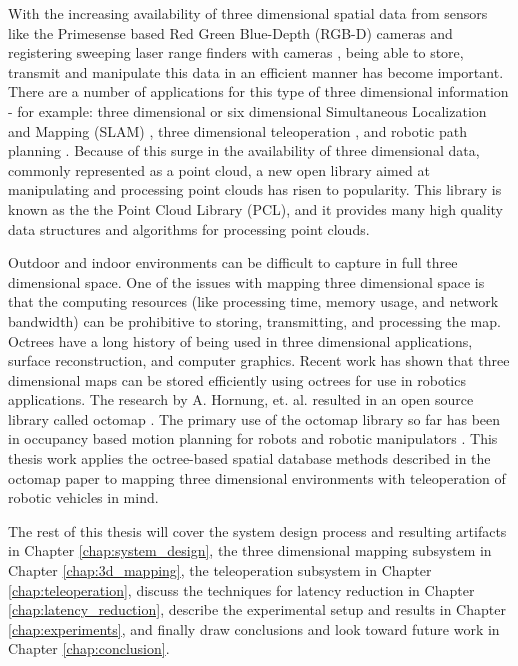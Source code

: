 \documentclass[12pt]{report}
\begin{document}
With the increasing availability of three dimensional spatial data from sensors like the Primesense based Red Green Blue-Depth (RGB-D) cameras \cite{PRIMESENSE} and registering sweeping laser range finders with cameras \cite{photo_real}, being able to store, transmit and manipulate this data in an efficient manner has become important.  There are a number of applications for this type of three dimensional information - for example: three dimensional or six dimensional Simultaneous Localization and Mapping (SLAM) \cite{biswasdepth}, three dimensional teleoperation \cite{photo_real}, and robotic path planning \cite{3DCOLLISION}.  Because of this surge in the availability of three dimensional data, commonly represented as a point cloud, a new open library aimed at manipulating and processing point clouds has risen to popularity.  This library is known as the the Point Cloud Library (PCL)\cite{rusu20113d}, and it provides many high quality data structures and algorithms for processing point clouds.
  
Outdoor and indoor environments can be difficult to capture in full three dimensional space. One of the issues with mapping three dimensional space is that the computing resources (like processing time, memory usage, and network bandwidth) can be prohibitive to storing, transmitting, and processing the map. Octrees have a long history of being used in three dimensional applications\cite{boada2001multiresolution}, surface reconstruction\cite{kazhdan2006poisson}, and computer graphics\cite{fang1996deformable}. Recent work has shown that three dimensional maps can be stored efficiently using octrees for use in robotics applications\cite{octomap}. The research by A. Hornung, et. al. resulted in an open source library called octomap \cite{octomap}. The primary use of the octomap library so far has been in occupancy based motion planning for robots and robotic manipulators \cite{3DCOLLISION}. This thesis work applies the octree-based spatial database methods described in the octomap paper to mapping three dimensional environments with teleoperation of robotic vehicles in mind.



The rest of this thesis will cover the system design process and resulting artifacts in Chapter \ref{chap:system_design}, the three dimensional mapping subsystem in Chapter \ref{chap:3d_mapping}, the teleoperation subsystem in Chapter \ref{chap:teleoperation}, discuss the techniques for latency reduction in Chapter \ref{chap:latency_reduction}, describe the experimental setup and results in Chapter \ref{chap:experiments}, and finally draw conclusions and look toward future work in Chapter \ref{chap:conclusion}.
\end{document}
